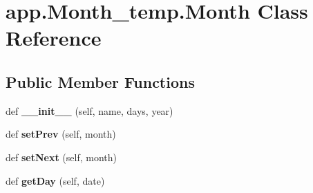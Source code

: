 \hypertarget{classapp_1_1Month__temp_1_1Month}{}\section{app.\+Month\+\_\+temp.\+Month Class Reference}
\label{classapp_1_1Month__temp_1_1Month}
\subsection*{Public Member Functions}
\begin{DoxyCompactItemize}
\item 
def {\bfseries \+\_\+\+\_\+init\+\_\+\+\_\+} (self, name, days, year)\hypertarget{classapp_1_1Month__temp_1_1Month_aaea5d215e1aa4d0b8c0ca79f98286dea}{}\label{classapp_1_1Month__temp_1_1Month_aaea5d215e1aa4d0b8c0ca79f98286dea}

\item 
def {\bfseries set\+Prev} (self, month)\hypertarget{classapp_1_1Month__temp_1_1Month_afad3d67e8e824be4326bf80158fde1fe}{}\label{classapp_1_1Month__temp_1_1Month_afad3d67e8e824be4326bf80158fde1fe}

\item 
def {\bfseries set\+Next} (self, month)\hypertarget{classapp_1_1Month__temp_1_1Month_ac19254c89b0efd1d2edad194af95442b}{}\label{classapp_1_1Month__temp_1_1Month_ac19254c89b0efd1d2edad194af95442b}

\item 
def {\bfseries get\+Day} (self, date)\hypertarget{classapp_1_1Month__temp_1_1Month_a2c18670dfb978bfde9e6dc8b7b97ded5}{}\label{classapp_1_1Month__temp_1_1Month_a2c18670dfb978bfde9e6dc8b7b97ded5}

\end{DoxyCompactItemize}
